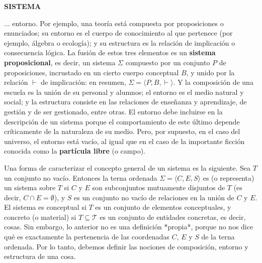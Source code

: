 \begin{center}
{\fontsize{16}{18}\selectfont \textbf{SISTEMA}}\\[0.8cm]
\end{center}

\vspace{1cm}

{\fontsize{13}{15}\selectfont
... entorno. Por ejemplo, una teoría está compuesta por proposiciones o enunciados; su entorno es el cuerpo de conocimiento al que pertenece (por ejemplo, álgebra o ecología); y su estructura es la relación de implicación o consecuencia lógica. La fusión de estos tres elementos es un \textbf{sistema proposicional}, es decir, un sistema $\Sigma$ compuesto por un conjunto $P$ de proposiciones, incrustado en un cierto cuerpo conceptual $B$, y unido por la relación $\vdash$ de implicación: en resumen, $\Sigma = \langle P, B, \vdash \rangle$. Y la composición de una escuela es la unión de su personal y alumnos; el entorno es el medio natural y social; y la estructura consiste en las relaciones de enseñanza y aprendizaje, de gestión y de ser gestionado, entre otras. El entorno debe incluirse en la descripción de un sistema porque el comportamiento de este último depende críticamente de la naturaleza de su medio. Pero, por supuesto, en el caso del universo, el entorno está vacío, al igual que en el caso de la importante ficción conocida como la \textbf{partícula libre} (o campo).

Una forma de caracterizar el concepto general de un sistema es la siguiente. Sea $T$ un conjunto no vacío. Entonces la terna ordenada $\Sigma = \langle C, E, S \rangle$ es (o representa) un sistema sobre $T$ si $C$ y $E$ son subconjuntos mutuamente disjuntos de $T$ (es decir, $C \cap E = \emptyset$), y $S$ es un conjunto no vacío de relaciones en la unión de $C$ y $E$. El sistema es conceptual si $T$ es un conjunto de elementos conceptuales, y concreto (o material) si $T \subseteq \mathcal{T}$ es un conjunto de entidades concretas, es decir, cosas. Sin embargo, lo anterior no es una definición *propia*, porque no nos dice qué es exactamente la pertenencia de las coordenadas $C$, $E$ y $S$ de la terna ordenada. Por lo tanto, debemos definir las nociones de composición, entorno y estructura de una cosa.

}
